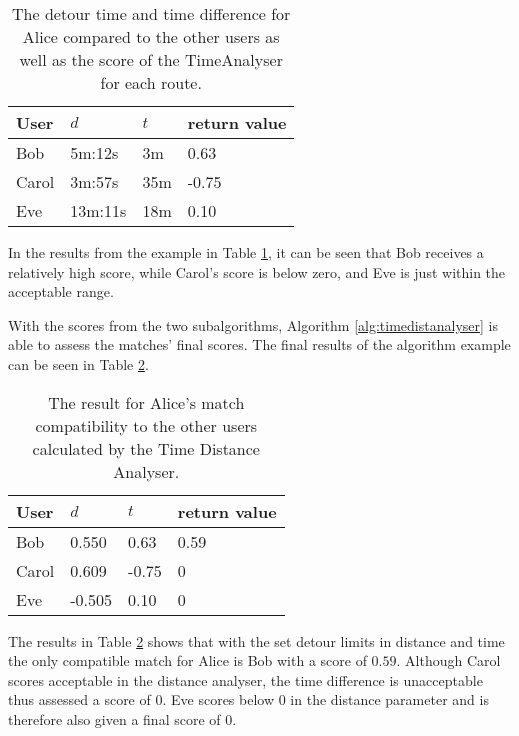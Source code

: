 \begin{table}[!ht]
\centering
\begin{tabular}{@{}llll@{}}
\toprule
\textbf{User} 	& \textbf{$d$} & \textbf{$t$} 	& \textbf{return value} \\ \midrule
Bob         	& 5m:12s       & 3m			    & 0.63				\\
Carol         	& 3m:57s       & 35m	      	& -0.75       		\\
Eve           	& 13m:11s      & 18m			& 0.10        		\\ \bottomrule
\end{tabular}
\caption{The detour time and time difference for Alice compared to the other users as well as the score of the TimeAnalyser for each route.}
\label{tbl:time}
\end{table}
 
In the results from the example in Table \ref{tbl:time}, it can be seen that Bob receives a relatively high score, while Carol's score is below zero, and Eve is just within the acceptable range. 

With the scores from the two subalgorithms, Algorithm \ref{alg:timedistanalyser} is able to assess the matches' final scores.
The final results of the algorithm example can be seen in Table \ref{tbl:timedist}.

\begin{table}[!ht]
\centering
\begin{tabular}{@{}llll@{}}
\toprule
\textbf{User} 	& \textbf{$d$} & \textbf{$t$} 	& \textbf{return value} \\ \midrule
Bob         	& 0.550 	   & 0.63		    & 0.59					\\
Carol         	& 0.609        & -0.75	      	& 0       				\\
Eve           	& -0.505       & 0.10			& 0        				\\ \bottomrule
\end{tabular}
\caption{The result for Alice's match compatibility to the other users calculated by the Time Distance Analyser.}
\label{tbl:timedist}
\end{table}

The results in Table \ref{tbl:timedist} shows that with the set detour limits in distance and time the only compatible match for Alice is Bob with a score of $0.59$. 
Although Carol scores acceptable in the distance analyser, the time difference is unacceptable thus assessed a score of $0$.
Eve scores below 0 in the distance parameter and is therefore also given a final score of $0$.

